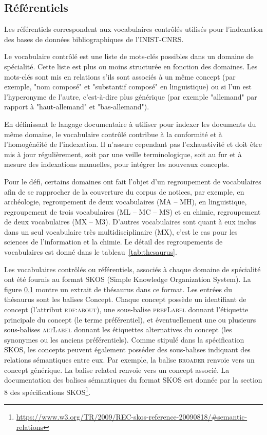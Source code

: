 \documentclass[10pt,twoside]{article}
\newcommand{\og}{"}
\newcommand{\fg}{"}
\begin{document}
    \subsection{Référentiels}
        Les référentiels correspondent aux vocabulaires contrôlés utilisés pour l’indexation des bases de données bibliographiques de l’INIST-CNRS.
        
     Le vocabulaire contrôlé est une liste de mots-clés possibles dans un
        domaine  de spécialité. Cette liste est plus ou moins structurée en
        fonction des domaines.
        Les mots-clés sont mis en relations s'ils sont associés à un même
        concept (par exemple, \og{}nom composé\fg{} et \og{}substantif
        composé\fg{} en linguistique) ou si l'un est l'hyperonyme de l'autre,
        c'est-à-dire plus  générique (par exemple \og{}allemand\fg{} par
        rapport à \og{}haut-allemand\fg{} et \og{}bas-allemand\fg{}).
        
        En définissant le langage documentaire à utiliser pour indexer les
        documents du même domaine, le vocabulaire contrôlé contribue à la
        conformité et à l'homogénéité de l'indexation. Il n'assure cependant pas
        l'exhaustivité et doit être mis à jour régulièrement, soit par une
        veille terminologique, soit au fur et à mesure des indexations
        manuelles, pour intégrer les nouveaux concepts. 
         
         Pour le défi, certains domaines ont fait l’objet d’un regroupement de vocabulaires afin de se rapprocher de la couverture du corpus de notices, par exemple, en archéologie, regroupement de deux vocabulaires (MA – MH), en  linguistique, regroupement de trois vocabulaires (ML – MC – MS) et en chimie, regroupement de deux vocabulaires (MX – M3). D’autres vocabulaires sont quant à eux inclus dans un seul vocabulaire très multidisciplinaire (MX), c’est le cas pour les sciences de l’information et la chimie. 
         Le détail des regroupements de vocabulaires est donné dans le tableau~\ref{tab:thesaurus}.
         
         Les  vocabulaires contrôlés ou référentiels, associés à chaque domaine de  spécialité ont été fournis au format SKOS (Simple Knowledge Organization System). La figure \ref{} montre un extrait de thésaurus dans ce format. Les entrées du thésaurus sont les balises Concept.
Chaque concept possède un identifiant de concept (l’attribut \textsc{rdf:about}), une sous-balise \textsc{prefLabel} donnant l’étiquette principale du concept (le terme préférentiel), et éventuellement une ou plusieurs sous-balises \textsc{altLabel} donnant les étiquettes alternatives du concept (les synonymes ou les anciens préférentiels). Comme stipulé dans la spécification SKOS, les concepts peuvent également posséder des sous-balises indiquant des relations sémantiques entre eux.
Par exemple, la balise \textsc{broader} renvoie vers un concept générique. La balise related renvoie vers un concept associé. La documentation des balises sémantiques du format SKOS est donnée par la section 8 des spécifications SKOS\footnote{\url{https://www.w3.org/TR/2009/REC-skos-reference-20090818/#semantic-relations}}.
\end{document}
